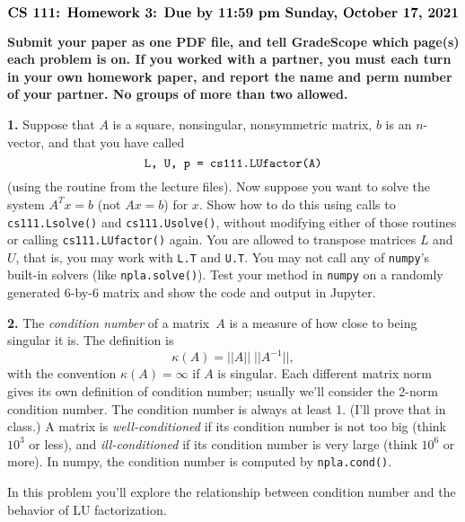 \documentclass[11pt]{article}
\begin{document}
$$\mbox{\Large \bf CS 111: Homework 3: Due by 11:59 pm Sunday, October 17, 2021}$$
\par\smallskip\noindent
{\bf Submit your paper as one PDF file,
and tell GradeScope which page(s) each problem is on.
If you worked with a partner, you must each turn in your own 
homework paper, and report the name and perm number of your partner.
No groups of more than two allowed.
}

\par\bigskip
{\bf 1.}
Suppose that $A$ is a square, nonsingular, nonsymmetric matrix, 
$b$ is an $n$-vector, and that you have called 
$$\mbox{\tt L, U, p = cs111.LUfactor(A)}$$
(using the routine from the lecture files).
Now suppose you want to solve the system $A^Tx=b$ (not $Ax=b$) for $x$.
Show how to do this using calls to {\tt cs111.Lsolve()} 
and {\tt cs111.Usolve()},
without modifying either of those routines 
or calling {\tt cs111.LUfactor()} again.
You are allowed to transpose matrices $L$ and $U$, that is, 
you may work with {\tt L.T} and {\tt U.T}.
You may not call any of {\tt numpy}'s built-in solvers (like {\tt npla.solve()}).
Test your method in {\tt numpy} on a randomly generated 6-by-6 matrix
and show the code and output in Jupyter.


\par\bigskip
{\bf 2.} The {\em condition number} of a matrix~$A$ is a measure of how close
to being singular it is. The definition is
$$\kappa(A) = ||A|| \; ||A^{-1}||,$$
with the convention $\kappa(A)=\infty$ if $A$ is singular. 
Each different matrix norm gives its own definition of condition number;
usually we'll consider the 2-norm condition number.
The condition number is always at least 1. 
(I'll prove that in class.)
A matrix is {\em well-conditioned} if its condition number is not too big 
(think $10^3$ or less), and {\em ill-conditioned} if its condition number is
very large (think $10^6$ or more).
In numpy, the condition number is computed by {\tt npla.cond()}.

In this problem you'll explore the relationship between condition number and
the behavior of LU factorization. 
\end{document}
